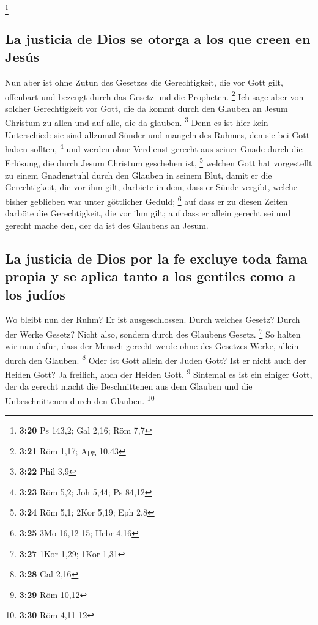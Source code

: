 \footnote{\textbf{3:20} Ps 143,2; Gal 2,16; Röm 7,7}

\hypertarget{la-justicia-de-dios-se-otorga-a-los-que-creen-en-jesuxfas}{%
\subsection{La justicia de Dios se otorga a los que creen en
Jesús}\label{la-justicia-de-dios-se-otorga-a-los-que-creen-en-jesuxfas}}

 Nun aber ist ohne Zutun des Gesetzes die Gerechtigkeit,
die vor Gott gilt, offenbart und bezeugt durch das Gesetz und die
Propheten. \footnote{\textbf{3:21} Röm 1,17; Apg 10,43} 
Ich sage aber von solcher Gerechtigkeit vor Gott, die da kommt durch den
Glauben an Jesum Christum zu allen und auf alle, die da glauben.
\footnote{\textbf{3:22} Phil 3,9}  Denn es ist hier kein
Unterschied: sie sind allzumal Sünder und mangeln des Ruhmes, den sie
bei Gott haben sollten, \footnote{\textbf{3:23} Röm 5,2; Joh 5,44; Ps
  84,12}  und werden ohne Verdienst gerecht aus seiner
Gnade durch die Erlösung, die durch Jesum Christum geschehen ist,
\footnote{\textbf{3:24} Röm 5,1; 2Kor 5,19; Eph 2,8} 
welchen Gott hat vorgestellt zu einem Gnadenstuhl durch den Glauben in
seinem Blut, damit er die Gerechtigkeit, die vor ihm gilt, darbiete in
dem, dass er Sünde vergibt, welche bisher geblieben war unter göttlicher
Geduld; \footnote{\textbf{3:25} 3Mo 16,12-15; Hebr 4,16} 
auf dass er zu diesen Zeiten darböte die Gerechtigkeit, die vor ihm
gilt; auf dass er allein gerecht sei und gerecht mache den, der da ist
des Glaubens an Jesum.

\hypertarget{la-justicia-de-dios-por-la-fe-excluye-toda-fama-propia-y-se-aplica-tanto-a-los-gentiles-como-a-los-juduxedos}{%
\subsection{La justicia de Dios por la fe excluye toda fama propia y se
aplica tanto a los gentiles como a los
judíos}\label{la-justicia-de-dios-por-la-fe-excluye-toda-fama-propia-y-se-aplica-tanto-a-los-gentiles-como-a-los-juduxedos}}

 Wo bleibt nun der Ruhm? Er ist ausgeschlossen. Durch
welches Gesetz? Durch der Werke Gesetz? Nicht also, sondern durch des
Glaubens Gesetz. \footnote{\textbf{3:27} 1Kor 1,29; 1Kor 1,31}
 So halten wir nun dafür, dass der Mensch gerecht werde
ohne des Gesetzes Werke, allein durch den Glauben. \footnote{\textbf{3:28}
  Gal 2,16}  Oder ist Gott allein der Juden Gott? Ist er
nicht auch der Heiden Gott? Ja freilich, auch der Heiden Gott.
\footnote{\textbf{3:29} Röm 10,12}  Sintemal es ist ein
einiger Gott, der da gerecht macht die Beschnittenen aus dem Glauben und
die Unbeschnittenen durch den Glauben. \footnote{\textbf{3:30} Röm
  4,11-12}

